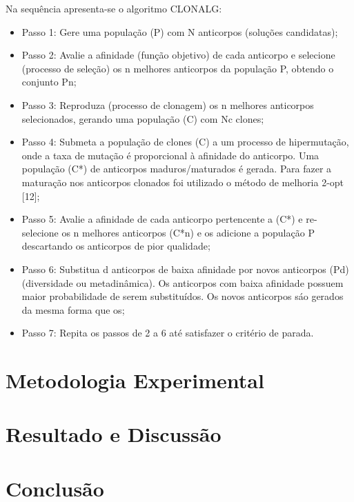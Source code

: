 \documentclass[conference]{IEEEtran}
\begin{document}
    Na sequência apresenta-se o algoritmo CLONALG:
    \begin{itemize}
    
    \item Passo 1: Gere uma população (P) com N anticorpos (soluções candidatas);
    
    \item Passo  2:  Avalie  a  afinidade  (função  objetivo)  de  cada  anticorpo  e  selecione  (processo de seleção) os n melhores anticorpos da população P, obtendo o conjunto Pn; 
    
    \item Passo 3: Reproduza  (processo de clonagem) os  n melhores anticorpos selecionados, gerando uma  população  (C)  com  Nc  clones; 
    
    \item Passo 4: Submeta a população de clones (C) a um processo de hipermutação, onde a taxa de mutação é proporcional à afinidade do anticorpo. Uma população (C*) de anticorpos maduros/maturados  é  gerada. Para  fazer  a  maturação nos  anticorpos  clonados  foi utilizado o método de melhoria 2-opt [12]; 
    
    \item Passo 5: Avalie a afinidade de cada anticorpo pertencente a (C*) e re-selecione os n melhores anticorpos  (C*{n})  e os  adicione a  população P  descartando  os anticorpos  de pior qualidade; 
    
    \item Passo 6: Substitua d anticorpos de baixa afinidade por novos anticorpos (P{d}) (diversidade ou metadinâmica). Os anticorpos com baixa afinidade possuem maior probabilidade de serem substituídos. Os novos anticorpos sáo gerados da mesma forma que os; 
    \item Passo 7: Repita os passos de 2 a 6 até satisfazer o critério de parada. 
    \end{itemize}
    
\section{Metodologia Experimental}
    
 
\section{Resultado e Discussão}

   
\section*{Conclusão}
\end{document}
